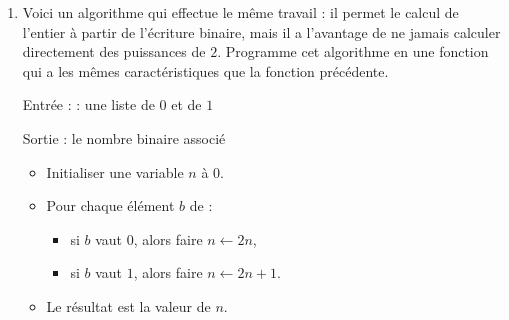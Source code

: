 \documentclass[11pt,class=report,crop=false]{standalone}
\begin{document}
\begin{activite}
\begin{enumerate}
  
  \item Voici un algorithme qui effectue le même travail : il permet le calcul de l'entier à partir de l'écriture binaire, mais il a l'avantage de ne jamais calculer directement des puissances de $2$. Programme cet algorithme en une fonction  qui a les mêmes caractéristiques que la fonction précédente.
  
  \begin{algorithme}
  Entrée :  : une liste de $0$ et de $1$

  Sortie : le nombre binaire associé 

  \begin{itemize}
    \item  Initialiser une variable $n$ à $0$.

    
    \item  Pour chaque élément $b$ de  :
    
     \begin{itemize} 
       \item si $b$ vaut $0$, alors faire $n \leftarrow 2n$,
       \item si $b$ vaut $1$, alors faire $n \leftarrow 2n+1$.
     \end{itemize}    
         
    \item Le résultat est la valeur de $n$.
  \end{itemize} 
             
 \end{algorithme}
 
\end{enumerate}

\end{activite}
  
  
\end{document}
